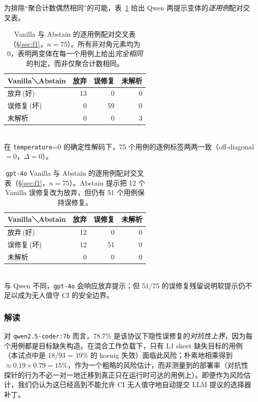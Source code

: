 为排除“聚合计数偶然相同”的可能，表~\ref{tab:falseheal-paired} 给出 Qwen 两提示变体的\emph{逐用例}配对交叉表。

\begin{table}[t]
\centering
\caption{Vanilla 与 Abstain 的逐用例配对交叉表（\S\ref{sec:f1}，$n=75$）。所有非对角元素均为 0，表明两变体在每一个用例上给出\emph{完全相同}的判定，而非仅聚合计数相同。}
\label{tab:falseheal-paired}
\small
\begin{tabular}{lrrr}
\toprule
Vanilla＼Abstain & 放弃 & 误修复 & 未解析 \\
\midrule
放弃\,(好)   & 13 & 0 & 0 \\
误修复\,(坏) & 0  & 59 & 0 \\
未解析       & 0  & 0 & 3 \\
\bottomrule
\end{tabular}
\\[2pt]
{\scriptsize 在 \texttt{temperature}=0 的确定性解码下，75 个用例的逐例标签两两一致（off-diagonal $=0$，$\Delta=0$）。}
\end{table}

\begin{table}[t]
\centering
\caption{\texttt{gpt-4o} Vanilla 与 Abstain 的逐用例配对交叉表（\S\ref{sec:f1}，$n=75$）。Abstain 提示把 12 个 Vanilla 误修复改为放弃，但仍有 51 个用例保持误修复。}
\label{tab:falseheal-gpt-paired}
\small
\begin{tabular}{lrrr}
\toprule
Vanilla＼Abstain & 放弃 & 误修复 & 未解析 \\
\midrule
放弃\,(好)   & 12 & 0 & 0 \\
误修复\,(坏) & 12 & 51 & 0 \\
未解析       & 0  & 0 & 0 \\
\bottomrule
\end{tabular}
\\[2pt]
{\scriptsize 与 Qwen 不同，\texttt{gpt-4o} 会响应放弃提示；但 51/75 的误修复残留说明软提示仍不足以成为无人值守 CI 的安全边界。}
\end{table}

\subsubsection{解读}
对 \texttt{qwen2.5-coder:7b} 而言，78.7\% 是该协议下隐性误修复的\emph{对抗性上界}，因为每个用例都是目标缺失构造。在混合工作负载下，只有 L1 sheet 缺失目标的用例（本试点中是 18/93 = 19\% 的 koenig 失效）面临此风险；朴素地相乘得到 $\approx 0.19 \times 0.79 = 15\%$，作为一个粗略的风险估计，而非测量到的部署率（对抗性探针的行为不必一对一地迁移到真正只在运行时可达的用例上）。即便作为风险估计，我们仍认为这已经高到不能允许 CI 无人值守地自动提交 LLM 提议的选择器补丁。


